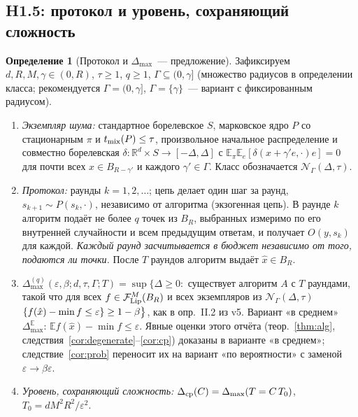 \documentclass[11pt,a4paper]{article}
\numberwithin{equation}{section}
\theoremstyle{definition}
\newtheorem{definition}[theorem]{Определение}
\theoremstyle{remark}
\newcommand{\E}{\mathbb E}\newcommand{\R}{\mathbb R}\newcommand{\N}{\mathbb N}\let\Prob\relax\newcommand{\Prob}{\mathbb P}
\newcommand{\Dmax}{\Delta_{\max}}\newcommand{\Dcp}{\Delta_{\rm cp}}
\newcommand{\cN}{\mathcal N}\newcommand{\cG}{\mathcal G}\newcommand{\cF}{\mathcal F}\newcommand{\cS}{\mathcal S}
\begin{document}
\subsection{H1.5: протокол и уровень, сохраняющий сложность}
\begin{definition}[Протокол и $\Dmax$~--- предложение]\label{def:dmax}
Зафиксируем $d,R,M,\gamma\in(0,R)$, $\tau\ge1$, $q\ge1$, $\Gamma\subseteq(0,\gamma]$ (множество радиусов в определении класса; рекомендуется $\Gamma=(0,\gamma]$, $\Gamma=\{\gamma\}$~--- вариант с фиксированным радиусом).
\begin{enumerate}[label=(\roman*)]
\item \emph{Экземпляр шума:} стандартное борелевское $S$, марковское ядро $P$ со стационарным $\pi$ и $t_{\rm mix}(P)\le\tau$, произвольное начальное распределение и совместно борелевская $\delta:\R^d\times S\to[-\Delta,\Delta]$ с $\E_\pi\E_e[\delta(x+\gamma'e,\cdot)e]=0$ для почти всех $x\in B_{R-\gamma'}$ и каждого $\gamma'\in\Gamma$. Класс обозначается $\cN_\Gamma(\Delta,\tau)$.
\item \emph{Протокол:} раунды $k=1,2,\dots$; цепь делает один шаг за раунд, $s_{k+1}\sim P(s_k,\cdot)$, независимо от алгоритма (экзогенная цепь). В раунде $k$ алгоритм подаёт не более $q$ точек из $B_R$, выбранных измеримо по его внутренней случайности и всем предыдущим ответам, и получает $O(y,s_k)$ для каждой. \emph{Каждый раунд засчитывается в бюджет независимо от того, подаются ли точки.} После $T$ раундов алгоритм выдаёт $\hat x\in B_R$.
\item $\Dmax^{(q)}(\varepsilon,\beta;d,\tau,\Gamma;T)=\sup\big\{\Delta\ge0:$ существует алгоритм $A$ с $T$ раундами, такой что для всех $f\in\cF^M_{\rm Lip}(B_R)$ и всех экземпляров из $\cN_\Gamma(\Delta,\tau)$ $\Prob\{f(\hat x)-\min f\le\varepsilon\}\ge1-\beta\big\}$, как в опр.~II.2 из v5. Вариант «в среднем» $\Dmax^{\E}$: $\E f(\hat x)-\min f\le\varepsilon$. Явные оценки этого отчёта (теор.~\ref{thm:alg}, следствия~\ref{cor:degenerate}--\ref{cor:cp}) доказаны в варианте «в среднем»; следствие~\ref{cor:prob} переносит их на вариант «по вероятности» с заменой $\varepsilon\to\beta\varepsilon$.
\item \emph{Уровень, сохраняющий сложность:} $\Dcp(C)=\Dmax(T=C\,T_0)$, $T_0=dM^2R^2/\varepsilon^2$.
\end{enumerate}
\end{definition}
\end{document}
